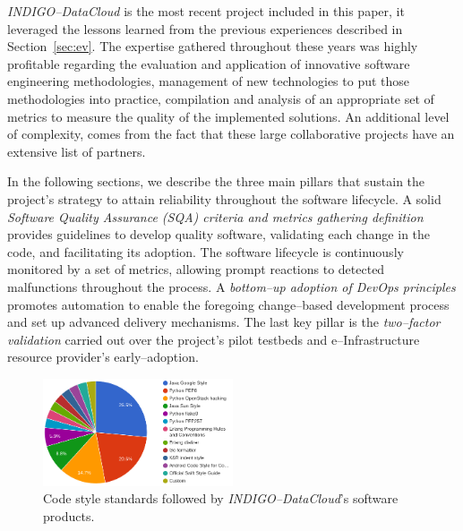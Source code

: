 \documentclass[journal]{IEEEtran}
\begin{document}
{\sl INDIGO--DataCloud} is the most recent project included in this paper, it
leveraged the lessons learned from the previous experiences described in
Section~\ref{sec:ev}. The expertise gathered throughout these years was highly
profitable regarding the evaluation and application of innovative software engineering
methodologies, management of new technologies to put those methodologies
into practice, compilation and analysis of an appropriate set of metrics to measure the
quality of the implemented solutions.
An additional level of complexity, comes from the fact that these large collaborative projects
have an extensive list of partners.

In the following sections, we describe the three main pillars that sustain the project's strategy to attain reliability throughout the
software lifecycle. A solid \textit{Software Quality Assurance (SQA) criteria
and metrics gathering definition} provides guidelines to develop quality
software, validating each change in the code, and facilitating its adoption. The software lifecycle is continuously monitored
by a set of metrics, allowing prompt reactions to detected malfunctions throughout the
process. A \textit{bottom--up adoption of DevOps principles} promotes automation to enable
the foregoing change--based development process and set up advanced delivery mechanisms.
The last key pillar is the \textit{two--factor validation} carried out over the project's pilot testbeds and
e--Infrastructure resource provider's early--adoption.

\begin{figure}[ht]
\centering
\includegraphics[width=0.5\textwidth]{images/codestyle.png}
\caption{Code style standards followed by {\sl INDIGO--DataCloud}'s software products.}
\label{fig:fig_codestyle}
\end{figure}
\end{document}
